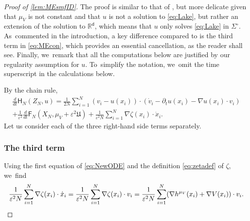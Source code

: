 \documentclass[10pt]{amsart}
\newcommand{\Sigmacirc}{\Sigma^\circ}
\theoremstyle{plain}
\theoremstyle{definition}
\DeclarePairedDelimiter{\pa}{\lparen}{\rparen}
\newcommand{\R}{{\mathbb{R}}}
\let\vep\varepsilon
\let\p\partial
\let\ux X
\let\uz Z
\newcommand{\Uu}{\mathfrak{U}}
\newcommand{\Fr}{\mathsf{F}}
\newcommand{\Hr}{\mathsf{H}}
\renewcommand{\d}{\mathsf{d}}
\begin{document}
\begin{proof}[Proof of \cref{lem:MEsmfID}]
The proof is similar to that of \cite[Eq.\,(2.7)]{HkI2021}, but more delicate given that $\mu_V$ is not constant and that $u$ is not a solution to \eqref{eq:Lake}, but rather an extension of the solution to $\R^\d$, which means that $u$ only solves \eqref{eq:Lake} in $\Sigmacirc$. As~commented in the introduction, a key difference compared to \cite{HkI2021} is the third term in \eqref{eq:MEcon}, which provides an essential cancellation, as the reader shall see. Finally, we~remark that all the computations below are justified by our regularity assumption for $u$. To~simplify the notation, we~omit the time superscript in the calculations below.

By the chain rule,\vspace*{-5pt}\enlargethispage{\baselineskip}
\begin{multline}\label{eq:dtHNstart}
\frac{d}{dt}\Hr_{N}(\uz_N,u) = \frac{1}{2N}\sum_{i=1}^N (v_i-u(x_i)) \cdot (\dot{v}_i - \p_t u(x_i) - \nabla u(x_i)\cdot v_i) \\[-8pt]
+ \frac{1}{\vep^2}\frac{d}{dt}\Fr_N(\ux_N,\mu_V+\vep^2\Uu) + \frac{1}{\vep^2N}\sum_{i=1}^N \nabla\zeta(x_i)\cdot \dot{x}_i.
\end{multline}
Let us consider each of the three right-hand side terms separately.

\subsubsection*{The third term} Using the first equation of \eqref{eq:NewODE} and the definition \eqref{eq:zetadef} of $\zeta$, we~find\vspace*{-5pt}
\begin{equation}\label{eq:dtVcon}
\frac{1}{\vep^2 N}\sum_{i=1}^N \nabla\zeta(x_i)\cdot \dot{x}_i = \frac{1}{\vep^2 N}\sum_{i=1}^N\nabla \zeta(x_i)\cdot v_i = \frac{1}{\vep^2 N}\sum_{i=1}^N\pa*{\nabla h^{\mu_V}(x_i) + \nabla V(x_i)}\cdot v_i.
\end{equation}


\end{proof}
\end{document}

